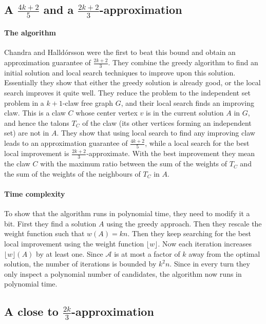 
\subsection{A $\frac{4k+2}{5}$ and a $\frac{2k+2}{3}$-approximation}\label{subsec:Chandra}

\paragraph{The algorithm} Chandra and Halld\'{o}rsson \cite{Chandra} were the first to beat this bound and obtain an approximation guarantee of $\frac{2k+2}{3}$. They combine the greedy algorithm to find an initial solution and local search techniques to improve upon this solution. Essentially they show that either the greedy solution is already good, or the local search improves it quite well. They reduce the problem to the independent set problem in a $k+1$-claw free graph $G$, and their local search finds an improving claw. This is a claw $C$ whose center vertex $v$ is in the current solution $A$ in $G$, and hence the talons $T_C$ of the claw (its other vertices forming an independent set) are not in $A$. They show that using local search to find any improving claw leads to an approximation guarantee of $\frac{4k+2}{5}$, while a local search for the best local improvement is $\frac{2k+2}{3}$-approximate. With the best improvement they mean the claw $C$ with the maximum ratio between the sum of the weights of $T_C$ and the sum of the weights of the neighbours of $T_C$ in $A$.

\paragraph{Time complexity} To show that the algorithm runs in polynomial time, they need to modify it a bit. First they find a solution $A$ using the greedy approach. Then they rescale the weight function such that $w(A) = kn$. Then they keep searching for the best local improvement using the weight function $\lfloor w \rfloor$. Now each iteration increases $\lfloor w \rfloor (A)$ by at least one. Since $\mathcal{A}$ is at most a factor of $k$ away from the optimal solution, the number of iterations is bounded by $k^2n$. Since in every turn they only inspect a polynomial number of candidates, the algorithm now runs in polynomial time.

\subsection{A close to $\frac{2k}{3}$-approximation}\label{subsec:2k/3}

